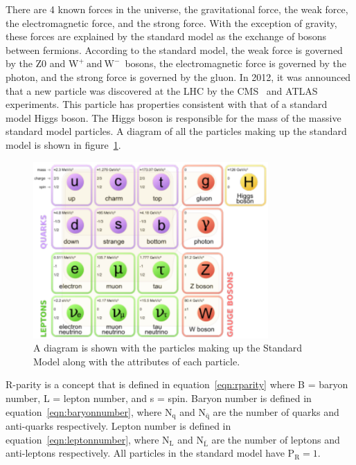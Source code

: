 There are 4 known forces in the universe, the gravitational force, the weak force, the electromagnetic force, and the strong force.
With the exception of gravity, these forces are explained by the standard model as the exchange of bosons between fermions.
According to the standard model, the weak force is governed by the Z0 and $\mathrm{W^{+}~and~W^{-}}$~bosons,
the electromagnetic force is governed by the photon, and the strong force is governed by the gluon.
In 2012, it was announced that a new particle was discovered at the LHC by the CMS~\cite{discovery} and ATLAS~\cite{higgsatlas} experiments.
This particle has properties consistent with that of a standard model Higgs boson.
The Higgs boson is responsible for the mass of the massive standard model particles.
A diagram of all the particles making up the standard model is shown in figure~\ref{fig:SM}.

\begin{figure}[!htb]
  \begin{center}
    \includegraphics[width=0.8\textwidth]{intro/figs/Standard_Model_of_Elementary_Particles.pdf}
    \caption{
      \label{fig:SM}
      A diagram is shown with the particles making up the Standard Model along with the attributes of each particle.
    }
  \end{center}
\end{figure}

R-parity is a concept that is defined in equation~\ref{eqn:rparity} where B = baryon number, L = lepton number, and s = spin. 
Baryon number is defined in equation~\ref{eqn:baryonnumber},
where $\mathrm{N_{q}}$ and $\mathrm{N_{\bar{q}}}$ are the number of quarks and anti-quarks respectively.
Lepton number is defined in equation~\ref{eqn:leptonnumber},
where $\mathrm{N_{L}}$ and $\mathrm{N_{\bar{L}}}$ are the number of leptons and anti-leptons respectively.
All particles in the standard model have $\mathrm{P_{R}} = 1$.

